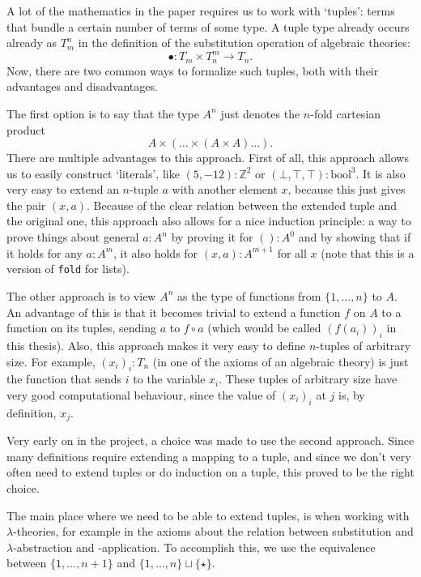 A lot of the mathematics in the paper requires us to work with `tuples': terms that bundle a certain number of terms of some type. A tuple type already occurs already as $ T_m^n $ in the definition of the substitution operation of algebraic theories:
\[ \bullet: T_m \times T_n^m \to T_n. \]
Now, there are two common ways to formalize such tuples, both with their advantages and disadvantages.

The first option is to say that the type $ A^n $ just denotes the $ n $-fold cartesian product
\[ A \times (\dots \times (A \times A) \dots). \]
There are multiple advantages to this approach. First of all, this approach allows us to easily construct `literals', like $ (5, -12) : \mathbb Z^2 $ or $ (\bot, \top, \top) : \mathrm{bool}^3 $. It is also very easy to extend an $ n $-tuple $ a $ with another element $ x $, because this just gives the pair $ (x, a) $. Because of the clear relation between the extended tuple and the original one, this approach also allows for a nice induction principle: a way to prove things about general $ a : A^n $ by proving it for $ () : A^0 $ and by showing that if it holds for any $ a : A^m $, it also holds for $ (x, a) : A^{m + 1} $ for all $ x $ (note that this is a version of \texttt{fold} for lists).

The other approach is to view $ A^n $ as the type of functions from $ \{ 1, \dots, n \} $ to $ A $. An advantage of this is that it becomes trivial to extend a function $ f $ on $ A $ to a function on its tuples, sending $ a $ to $ f \circ a $ (which would be called $ (f(a_i))_i $ in this thesis). Also, this approach makes it very easy to define $ n $-tuples of arbitrary size. For example, $ (x_i)_i : T_n $ (in one of the axioms of an algebraic theory) is just the function that sends $ i $ to the variable $ x_i $. These tuples of arbitrary size have very good computational behaviour, since the value of $ (x_i)_i $ at $ j $ is, by definition, $ x_j $.

Very early on in the project, a choice was made to use the second approach. Since many definitions require extending a mapping to a tuple, and since we don't very often need to extend tuples or do induction on a tuple, this proved to be the right choice.

The main place where we need to be able to extend tuples, is when working with $ \lambda $-theories, for example in the axioms about the relation between substitution and $ \lambda $-abstraction and -application. To accomplish this, we use the equivalence between $ \{ 1, \dots, n + 1 \} $ and $ \{ 1, \dots, n \} \sqcup \{ \star \} $.

